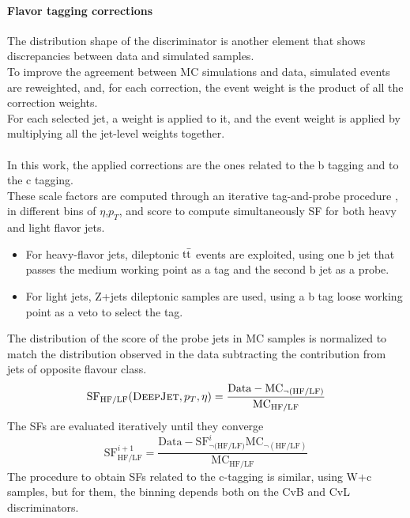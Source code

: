 \paragraph*{Flavor tagging corrections}
The distribution shape of the \DeepJet discriminator is another element that shows discrepancies between data and simulated samples.\\
To improve the agreement between MC simulations and data, simulated events are reweighted, and, for each correction, the event weight is the product of all the correction weights.\\
For each selected jet, a weight is applied to it, and the event weight is applied by multiplying all the jet-level weights together.
\\
\\
In this work, the applied corrections are the ones related to the b tagging and to the c tagging.\\
These scale factors are computed through an iterative tag-and-probe procedure \cite{2021B-tagging2018.}, in different bins of $\eta$,$p_T$, and \DeepJet score to compute simultaneously SF for both heavy and light flavor jets.
\begin{itemize}
    \item For heavy-flavor jets, dileptonic ${{\text{t}}{\bar{\text{t}}}}$ events are exploited, using one b jet that passes the medium working point as a tag and the second b jet as a probe.
    \item For light jets, Z+jets dileptonic samples are used, using a b tag loose working point as a veto to select the tag.
\end{itemize}
The distribution of the \DeepJet score of the probe jets in MC samples is normalized to match the distribution observed in the data subtracting the contribution from jets of opposite flavour class.
\begin{equation}
    \text{SF}_{\text{HF/LF}} ({\textsc{DeepJet}},p_T,\eta)=\frac{\text{Data}-\text{MC}_{\neg(\text{HF/LF})}}{\text{MC}_{\text{HF/LF}}}
\end{equation}
The SFs are evaluated iteratively until they converge
\begin{equation}
    \text{SF}_{\text{HF/LF}}^{i+1} =\dfrac{\text{Data}-\text{SF}_{\neg (\text{HF/LF)}}^{i} \text{MC}_{\neg(\text{HF/LF})}}{\text{MC}_{\text{HF/LF}}}
\end{equation}
The procedure to obtain SFs related to the c-tagging is similar, using W+c samples, but for them, the binning depends both on the CvB and CvL discriminators.



